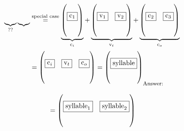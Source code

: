 \begin{align}
    \underbrace{\textbf{\Huge }}_{\text{??}} \underbrace{\text{\Huge }}_{\text{}} &\overset{\text{special case}}{\underset{\text{}}{=}} 
    \underbrace{
        \begin{pmatrix}\pmb{\text{\Large }}\\\boxed{\mathrm{c}_1}\\ \mathrm{}\\ \mathrm{} \end{pmatrix}
    }_{\mathrm{c}_i}
    +
    \underbrace{
        \begin{pmatrix}             
            \pmb{\text{\Large }}&\pmb{\text{\Large }}\\
            \boxed{\mathrm{v}_1}&\boxed{\mathrm{v}_2}\\
            \mathrm{}&\mathrm{}\\
            \mathrm{}&\mathrm{}
        \end{pmatrix}
    }_{\mathrm{v}_t}
    +
    \underbrace{
        \begin{pmatrix}
            \pmb{\text{\Large }} & \pmb{\text{\Large }}\\
            \boxed{\mathrm{c}_2} & \boxed{\mathrm{c}_3}\\
            \mathrm{} & \mathrm{}\\
            \mathrm{} & \mathrm{}
        \end{pmatrix}
    }_{\mathrm{c}_o}
    \\&=
    \begin{pmatrix}
        \pmb{\text{\Large }} & \pmb{\text{\Large }} & \pmb{\text{\Large }}\\
        \boxed{\mathrm{c}_i} & \boxed{\mathrm{v}_t} & \boxed{\mathrm{c}_o}\\
        \mathrm{} & \mathrm{} & \mathrm{}\\
        \mathrm{} & \mathrm{} & \mathrm{}
    \end{pmatrix}
    =
    \begin{pmatrix}\pmb{\text{\Large }}\\\boxed{\mathrm{syllable}}\\\mathrm{}\\\mathrm{}\end{pmatrix}_{\text{\footnotesize Answer: }}
\end{align}

\begin{align}
    \textbf{\Huge } =
    \begin{pmatrix}
        \pmb{\text{\Large }} & \pmb{\text{\Large }}\\
        \boxed{\mathrm{syllable}_1} & \boxed{\mathrm{syllable}_2}\\
        \mathrm{} & \mathrm{}\\
        \mathrm{} & \mathrm{}
    \end{pmatrix}
\end{align}